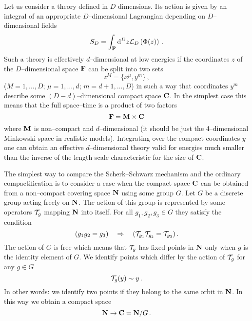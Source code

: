 \documentclass[a4paper,12pt]{article}
\def\d{{\rm d}}
\def\cL{{\cal L}}
\def\cT{{\cal T}}
\def\bC{{\bf C}}
\def\bF{{\bf F}}
\def\bM{{\bf M}}
\def\bN{{\bf N}}
\begin{document}
Let us consider a theory defined in $D$ dimensions. Its action is
given by an integral of an appropriate $D$--dimensional Lagrangian
depending on $D$--dimensional fields 
\begin{equation}
S_D=\int_\bF\d^Dz\cL_D\left(\Phi(z)\right)
\,.
\end{equation}
Such a theory is effectively $d$--dimensional at low energies if
the coordinates $z$ of the $D$--dimensional space $\bF$ can be
split into two sets
\begin{equation}
z^M=\{x^\mu,y^m\}
\,,
\end{equation}
($M=1,\ldots,D$; $\mu=1,\ldots,d$; $m=d+1,\ldots,D$) in such a way
that coordinates $y^m$ describe some $(D-d)$--dimensional compact
space $\bC$. In the simplest case this means that the full space--time
is a product of two factors
\begin{equation}
\bF=\bM\times\bC
\end{equation}
where $\bM$ is non--compact and $d$--dimensional (it should be
just the 4--dimensional Minkowski space in realistic models). 
Integrating over the compact coordinates $y$ one can obtain an
effective $d$--dimensional theory valid for
energies much smaller than the inverse of the length scale
characteristic for the size of $\bC$. 


The simplest way to compare the Scherk--Schwarz mechanism and the
ordinary compactification is to consider a case when the compact space
$\bC$ can be obtained from a non--compact covering space $\bN$ using
some group $G$. Let $G$ be a discrete group acting freely on
$\bN$. The action of this group is represented by some operators
$\cT_g$ mapping $\bN$ into itself. For all $g_1,g_2,g_3\in G$ they
satisfy the condition
\begin{equation}
(g_1g_2=g_3)
\quad\Rightarrow\quad
(\cT_{g_1}\cT_{g_2}=\cT_{g_3})
\,.
\label{cTgroup}
\end{equation}
The action of $G$ is free which means that $\cT_g$ has fixed points in
$\bN$ only when $g$ is the identity element of $G$.
We identify points which differ by the action of $\cT_g$ for any 
$g\in G$
\begin{equation}
\cT_g(y) \sim y
\,.
\end{equation}
In other words: we identify two points if they belong to the same orbit
in $\bN$. In this way we obtain a compact space
\begin{equation}
\bN\to\bC=\bN/G
\,.
\end{equation}
\end{document}
